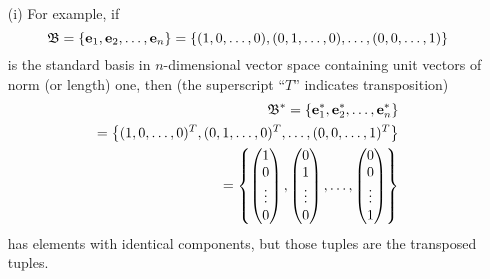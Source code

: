 {\color{blue}
\bexample
\begin{itemize}
\item[(i)]
For example,
if
$$
{\frak B}=\{{\bf e}_1, {\bf e}_2,\ldots ,{\bf e}_n\}
=
\{
(1,0,\ldots,0),
(0,1,\ldots,0),
\ldots,
(0,0,\ldots,1)
\}
$$
is the standard basis in $n$-dimensional vector space containing unit vectors of norm (or length) one,
then  (the superscript ``$T$'' indicates transposition)
\begin{equation}
\begin{split}
{\frak B}^*
=
\{{\bf e}_1^* ,{\bf e}_2^*, \ldots ,{\bf e}_n^* \}
\\
=
\left\{
(1,0,\ldots,0)^T,
(0,1,\ldots,0)^T,
\ldots,
(0,0,\ldots,1)^T
\right\}
\\
=
\left\{
\begin{pmatrix}
1\\
0\\
\vdots \\
0
\end{pmatrix}
,
\begin{pmatrix}
0\\
1\\
\vdots \\
0
\end{pmatrix}
,
\ldots ,
\begin{pmatrix}
0\\
0\\
\vdots \\
1
\end{pmatrix}
\right
\}
\end{split}
\end{equation}
has elements with identical components,
but those tuples are the transposed tuples.


\end{itemize}}
